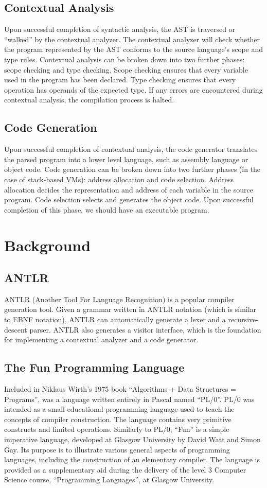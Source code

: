 \documentclass{l4proj}
\begin{document}
\subsection{Contextual Analysis}
Upon successful completion of syntactic analysis, the AST is traversed or ``walked'' by the contextual analyzer. The contextual analyzer will check whether the program represented by the AST conforms to the source language's scope and type rules. Contextual analysis can be broken down into two further phases: scope checking and type checking. Scope checking ensures that every variable used in the program has been declared. Type checking ensures that every operation has operands of the expected type. If any errors are encountered during contextual analysis, the compilation process is halted.

\subsection{Code Generation}
Upon successful completion of contextual analysis, the code generator translates the parsed program into a lower level language, such as assembly language or object code. Code generation can be broken down into two further phases (in the case of stack-based VMs): address allocation and code selection. Address allocation decides the representation and address of each variable in the source program. Code selection selects and generates the object code. Upon successful completion of this phase, we should have an executable program.

\section{Background}
\subsection{ANTLR}
ANTLR (Another Tool For Language Recognition) is a popular compiler generation tool. Given a grammar written in ANTLR notation (which is similar to EBNF notation), ANTLR can automatically generate a lexer and a recursive-descent parser. ANTLR also generates a visitor interface, which is the foundation for implementing a contextual analyzer and a code generator. 

\subsection{The Fun Programming Language}
Included in Niklaus Wirth's 1975 book ``Algorithms + Data Structures = Programs'', was a language written entirely in Pascal named ``PL/0''. PL/0 was intended as a small educational programming language used to teach the concepts of compiler construction. The language contains very primitive constructs and limited operations. Similarly to PL/0, ``Fun'' is a simple imperative language, developed at Glasgow University by David Watt and Simon Gay. Its purpose is to illustrate various general aspects of programming languages, including the construction of an elementary compiler. The language is provided as a supplementary aid during the delivery of the level 3 Computer Science course, ``Programming Languages'', at Glasgow University.
\end{document}
